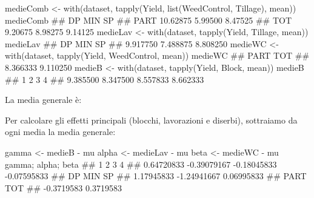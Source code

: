 \documentclass[a4paper,12pt,oneside]{book}
\newenvironment{Shaded}{\begin{snugshade}}{\end{snugshade}}
\newcommand{\SpecialCharTok}[1]{#1}
\newcommand{\DocumentationTok}[1]{#1}
\newcommand{\OtherTok}[1]{#1}
\newcommand{\FunctionTok}[1]{#1}
\newcommand{\NormalTok}[1]{#1}
\begin{document}
\begin{Shaded}
\begin{Highlighting}[]
\NormalTok{medieComb }\OtherTok{\textless{}{-}} \FunctionTok{with}\NormalTok{(dataset, }\FunctionTok{tapply}\NormalTok{(Yield, }
                                  \FunctionTok{list}\NormalTok{(WeedControl, Tillage), }
\NormalTok{                                  mean))}
\NormalTok{medieComb}
\DocumentationTok{\#\#            DP     MIN      SP}
\DocumentationTok{\#\# PART 10.62875 5.99500 8.47525}
\DocumentationTok{\#\# TOT   9.20675 8.98275 9.14125}
\NormalTok{medieLav }\OtherTok{\textless{}{-}} \FunctionTok{with}\NormalTok{(dataset, }\FunctionTok{tapply}\NormalTok{(Yield, Tillage, }
\NormalTok{                                  mean))}
\NormalTok{medieLav}
\DocumentationTok{\#\#       DP      MIN       SP }
\DocumentationTok{\#\# 9.917750 7.488875 8.808250}
\NormalTok{medieWC }\OtherTok{\textless{}{-}} \FunctionTok{with}\NormalTok{(dataset, }\FunctionTok{tapply}\NormalTok{(Yield, WeedControl, }
\NormalTok{                                  mean))}
\NormalTok{medieWC}
\DocumentationTok{\#\#     PART      TOT }
\DocumentationTok{\#\# 8.366333 9.110250}
\NormalTok{medieB }\OtherTok{\textless{}{-}} \FunctionTok{with}\NormalTok{(dataset, }\FunctionTok{tapply}\NormalTok{(Yield, Block, }
\NormalTok{                                  mean))}
\NormalTok{medieB}
\DocumentationTok{\#\#        1        2        3        4 }
\DocumentationTok{\#\# 9.385500 8.347500 8.557833 8.662333}
\end{Highlighting}
\end{Shaded}

La media generale è:

\begin{Shaded}
\end{Shaded}

Per calcolare gli effetti principali (blocchi, lavorazioni e diserbi), sottraiamo da ogni media la media generale:

\begin{Shaded}
\begin{Highlighting}[]
\NormalTok{gamma }\OtherTok{\textless{}{-}}\NormalTok{ medieB }\SpecialCharTok{{-}}\NormalTok{ mu}
\NormalTok{alpha }\OtherTok{\textless{}{-}}\NormalTok{ medieLav }\SpecialCharTok{{-}}\NormalTok{ mu}
\NormalTok{beta }\OtherTok{\textless{}{-}}\NormalTok{ medieWC }\SpecialCharTok{{-}}\NormalTok{ mu}
\NormalTok{gamma; alpha; beta}
\DocumentationTok{\#\#           1           2           3           4 }
\DocumentationTok{\#\#  0.64720833 {-}0.39079167 {-}0.18045833 {-}0.07595833}
\DocumentationTok{\#\#          DP         MIN          SP }
\DocumentationTok{\#\#  1.17945833 {-}1.24941667  0.06995833}
\DocumentationTok{\#\#       PART        TOT }
\DocumentationTok{\#\# {-}0.3719583  0.3719583}
\end{Highlighting}
\end{Shaded}
\end{document}
